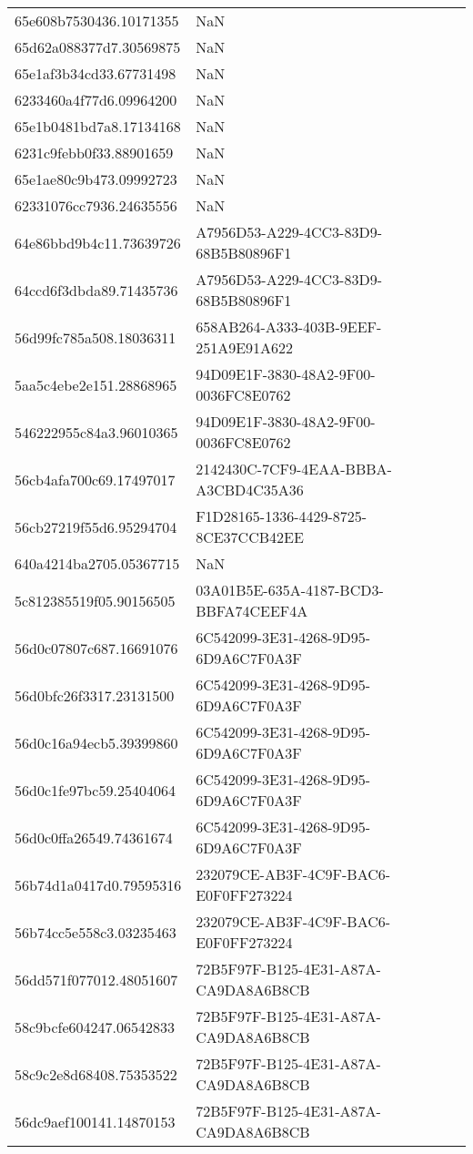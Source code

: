 \begin{tabular}{ll}
65e608b7530436.10171355 & NaN \\
65d62a088377d7.30569875 & NaN \\
65e1af3b34cd33.67731498 & NaN \\
6233460a4f77d6.09964200 & NaN \\
65e1b0481bd7a8.17134168 & NaN \\
6231c9febb0f33.88901659 & NaN \\
65e1ae80c9b473.09992723 & NaN \\
62331076cc7936.24635556 & NaN \\
64e86bbd9b4c11.73639726 & A7956D53-A229-4CC3-83D9-68B5B80896F1 \\
64ccd6f3dbda89.71435736 & A7956D53-A229-4CC3-83D9-68B5B80896F1 \\
56d99fc785a508.18036311 & 658AB264-A333-403B-9EEF-251A9E91A622 \\
5aa5c4ebe2e151.28868965 & 94D09E1F-3830-48A2-9F00-0036FC8E0762 \\
546222955c84a3.96010365 & 94D09E1F-3830-48A2-9F00-0036FC8E0762 \\
56cb4afa700c69.17497017 & 2142430C-7CF9-4EAA-BBBA-A3CBD4C35A36 \\
56cb27219f55d6.95294704 & F1D28165-1336-4429-8725-8CE37CCB42EE \\
640a4214ba2705.05367715 & NaN \\
5c812385519f05.90156505 & 03A01B5E-635A-4187-BCD3-BBFA74CEEF4A \\
56d0c07807c687.16691076 & 6C542099-3E31-4268-9D95-6D9A6C7F0A3F \\
56d0bfc26f3317.23131500 & 6C542099-3E31-4268-9D95-6D9A6C7F0A3F \\
56d0c16a94ecb5.39399860 & 6C542099-3E31-4268-9D95-6D9A6C7F0A3F \\
56d0c1fe97bc59.25404064 & 6C542099-3E31-4268-9D95-6D9A6C7F0A3F \\
56d0c0ffa26549.74361674 & 6C542099-3E31-4268-9D95-6D9A6C7F0A3F \\
56b74d1a0417d0.79595316 & 232079CE-AB3F-4C9F-BAC6-E0F0FF273224 \\
56b74cc5e558c3.03235463 & 232079CE-AB3F-4C9F-BAC6-E0F0FF273224 \\
56dd571f077012.48051607 & 72B5F97F-B125-4E31-A87A-CA9DA8A6B8CB \\
58c9bcfe604247.06542833 & 72B5F97F-B125-4E31-A87A-CA9DA8A6B8CB \\
58c9c2e8d68408.75353522 & 72B5F97F-B125-4E31-A87A-CA9DA8A6B8CB \\
56dc9aef100141.14870153 & 72B5F97F-B125-4E31-A87A-CA9DA8A6B8CB \\

\end{tabular}
